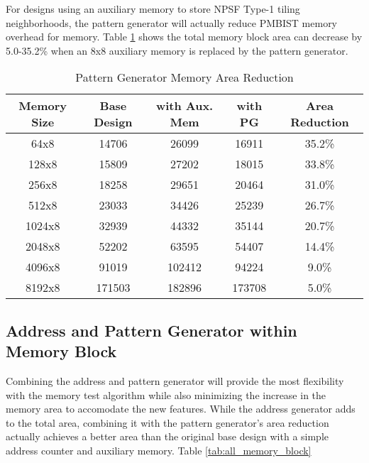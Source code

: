 For designs using an auxiliary memory to store NPSF Type-1 tiling neighborhoods, the pattern generator will actually reduce PMBIST memory overhead for memory.  Table \ref{tab:pg_memory_overhead} shows the total memory block area can decrease by 5.0-35.2\% when an 8x8 auxiliary memory is replaced by the pattern generator.  

\begin{table}[h]
\caption{Pattern Generator Memory Area Reduction}
\centering
\begin{tabular}{|c| c| c| c| c|}
\hline
Memory Size & Base Design & with Aux. Mem & with PG & Area Reduction \\
\hline
64x8   & 14706  & 26099  & 16911  & 35.2\% \\
128x8  & 15809  & 27202  & 18015  & 33.8\% \\
256x8  & 18258  & 29651  & 20464  & 31.0\% \\
512x8  & 23033  & 34426  & 25239  & 26.7\% \\
1024x8 & 32939  & 44332  & 35144  & 20.7\% \\
2048x8 & 52202  & 63595  & 54407  & 14.4\% \\
4096x8 & 91019  & 102412 & 94224  &  9.0\% \\
8192x8 & 171503 & 182896 & 173708 &  5.0\% \\ [0.5ex]
\hline
\end{tabular}
\label{tab:pg_memory_overhead}
\end{table}

\subsection{Address and Pattern Generator within Memory Block}
Combining the address and pattern generator will provide the most flexibility with the memory test algorithm while also minimizing the increase in the memory area to accomodate the new features.  While the address generator adds to the total area, combining it with the pattern generator's area reduction actually achieves a better area than the original base design with a simple address counter and auxiliary memory.  Table \ref{tab:all_memory_block}  

